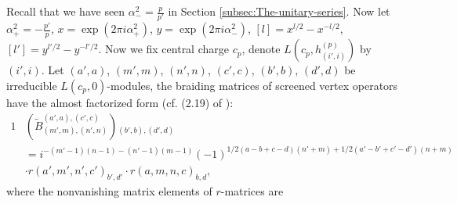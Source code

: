 \documentclass{article}
\begin{document}
	
	Recall that we have seen $\alpha_{-}^{2}=\frac{p}{p'}$ in Section
	\ref{subsec:The-unitary-series}. Now let $\alpha_{+}^{2}=-\frac{p'}{p}$,
	$x=\exp\left(2\pi i\alpha_{+}^{2}\right)$, $y=\exp\left(2\pi i\alpha_{-}^{2}\right)$,
	$\left[l\right]=x^{l/2}-x^{-l/2}$, $\left[l'\right]=y{}^{l'/2}-y{}^{-l'/2}.$
	Now we fix central charge $c_{p}$, denote $L\left(c_{p},h_{\left(i',i\right)}^{\left(p\right)}\right)$
	by $\left(i',i\right)$. Let $\left(a',a\right)$, $\left(m',m\right)$,
	$\left(n',n\right)$, $\left(c',c\right)$, $\left(b',b\right)$,
	$\left(d',d\right)$ be irreducible $L\left(c_{p},0\right)$-modules,
	the braiding matrices of screened vertex operators have the almost
	factorized form (cf. (2.19) of \cite{FFK}):
	\begin{alignat}{1}
		& \left(\tilde{B}_{\left(m',m\right),\left(n',n\right)}^{\left(a',a\right),\left(c',c\right)}\right){}_{\left(b',b\right),\left(d',d\right)}\nonumber \\
		& =i^{-\left(m'-1\right)\left(n-1\right)-\left(n'-1\right)\left(m-1\right)}\left(-1\right)^{1/2\left(a-b+c-d\right)\left(n'+m\right)+1/2\left(a'-b'+c'-d'\right)\left(n+m\right)}\label{FFK 2.19}\\
		& \cdot r\left(a',m',n',c'\right)_{b',d'}\cdot r\left(a,m,n,c\right)_{b,d},\nonumber
	\end{alignat}
	where the nonvanishing matrix elements of $r$-matrices are
	
\end{document}
